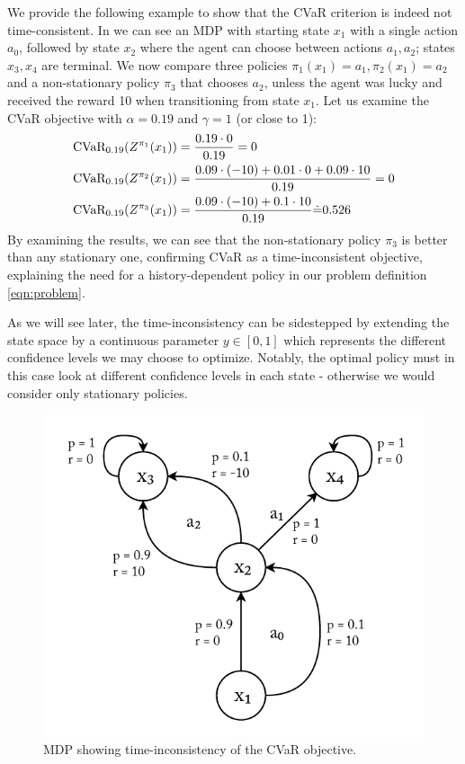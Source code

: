 We provide the following example to show that the CVaR criterion is indeed not time-consistent. In  we can see an MDP with starting state $x_1$ with a single action $a_0$, followed by state $x_2$ where the agent can choose between actions $a_1, a_2$; states $x_3, x_4$ are terminal. We now compare three policies $\pi_1(x_1)=a_1, \pi_2(x_1)=a_2$ and a non-stationary policy $\pi_3$ that chooses $a_2$, unless the agent was lucky and received the reward 10 when transitioning from state $x_1$.
Let us examine the CVaR objective with $\alpha=0.19$ and $\gamma=1$ (or close to 1):
\begin{align*}
&\text{CVaR}_{0.19}(Z^{\pi_1}(x_1))=\frac{0.19 \cdot 0}{0.19} = 0\\
&\text{CVaR}_{0.19}(Z^{\pi_2}(x_1))=\frac{0.09\cdot (-10) + 0.01 \cdot 0 + 0.09 \cdot 10}{0.19}=0\\
&\text{CVaR}_{0.19}(Z^{\pi_3}(x_1))=\frac{0.09 \cdot (-10)+ 0.1 \cdot 10}{0.19} \dot{=} 0.526
\end{align*}
By examining the results, we can see that the non-stationary policy $\pi_3$ is better than any stationary one, confirming CVaR as a time-inconsistent objective, explaining the need for a history-dependent policy in our problem definition \ref{eqn:problem}.

As we will see later, the time-inconsistency can be sidestepped by extending the state space by a continuous parameter $y \in [0, 1]$ which represents the different confidence levels we may choose to optimize. Notably, the optimal policy must in this case look at different confidence levels in each state - otherwise we would consider only stationary policies.

\begin{figure}
\center
\includegraphics[width=0.6\linewidth]{gfx/time.pdf}
\caption{MDP showing time-inconsistency of the CVaR objective.}
\label{fig:time-consistency}
\end{figure}

